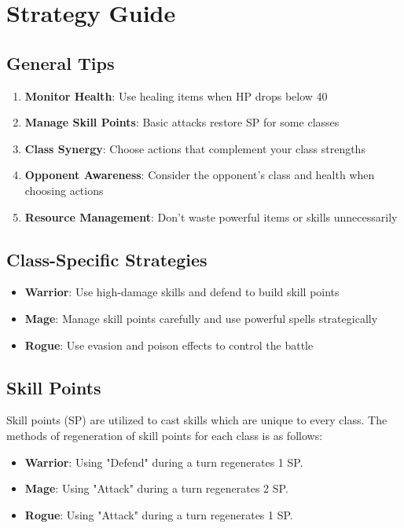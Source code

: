 \documentclass[12pt]{article}
\begin{document}
\section{Strategy Guide}
\label{sec:strategy}

\subsection{General Tips}
\begin{enumerate}
    \item \textbf{Monitor Health}: Use healing items when HP drops below 40
    \item \textbf{Manage Skill Points}: Basic attacks restore SP for some classes
    \item \textbf{Class Synergy}: Choose actions that complement your class strengths
    \item \textbf{Opponent Awareness}: Consider the opponent's class and health when choosing actions
    \item \textbf{Resource Management}: Don't waste powerful items or skills unnecessarily
\end{enumerate}

\subsection{Class-Specific Strategies}
\begin{itemize}
    \item \textbf{Warrior}: Use high-damage skills and defend to build skill points
    \item \textbf{Mage}: Manage skill points carefully and use powerful spells strategically
    \item \textbf{Rogue}: Use evasion and poison effects to control the battle
\end{itemize}

\subsection{Skill Points}
Skill points (SP) are utilized to cast skills which are unique to every class. The methods of regeneration of skill points for each class is as follows:
\begin{itemize}
    \item \textbf{Warrior}: Using "Defend" during a turn regenerates 1 SP.
    \item \textbf{Mage}: Using "Attack" during a turn regenerates 2 SP.
    \item \textbf{Rogue}: Using "Attack" during a turn regenerates 1 SP.
\end{itemize}
\end{document}
